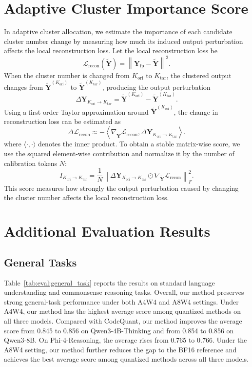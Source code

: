 \documentclass{article}
\begin{document}
\section{Adaptive Cluster Importance Score}
\label{sec:app:importance_score}
In adaptive cluster allocation, we estimate the importance of each candidate cluster number change by measuring how much its induced output perturbation affects the local reconstruction loss.
Let the local reconstruction loss be
\[
\mathcal{L}_{\mathrm{recon}}(\widetilde{\mathbf{Y}})
=
\left\|
\mathbf{Y}_{\mathrm{fp}}-\widetilde{\mathbf{Y}}
\right\|^2 .
\]
When the cluster number is changed from $K_{\mathrm{ori}}$ to $K_{\mathrm{tar}}$, the clustered output changes from $\widetilde{\mathbf{Y}}^{(K_{\mathrm{ori}})}$ to $\widetilde{\mathbf{Y}}^{(K_{\mathrm{tar}})}$, producing the output perturbation
\[
\Delta \mathbf{Y}_{K_{\mathrm{ori}}\rightarrow K_{\mathrm{tar}}}
=
\widetilde{\mathbf{Y}}^{(K_{\mathrm{ori}})}
-
\widetilde{\mathbf{Y}}^{(K_{\mathrm{tar}})} .
\]
Using a first-order Taylor approximation around
$\widetilde{\mathbf{Y}}^{(K_{\mathrm{ori}})}$, the change in reconstruction loss can be estimated as
\[
\Delta \mathcal{L}_{\mathrm{recon}}
\approx -
\left\langle
\nabla_{\widetilde{\mathbf{Y}}}\mathcal{L}_{\mathrm{recon}},
\Delta \mathbf{Y}_{K_{\mathrm{ori}}\rightarrow K_{\mathrm{tar}}}
\right\rangle .
\]
where $\langle \cdot,\cdot\rangle$ denotes the inner product.
To obtain a stable matrix-wise score, we use the squared element-wise contribution and normalize it by the number of calibration tokens $N$:
\[
I_{K_{\mathrm{ori}}\rightarrow K_{\mathrm{tar}}}
=
\frac{1}{N}
\left\|
\Delta\mathbf{Y}_{K_{\mathrm{ori}}\rightarrow K_{\mathrm{tar}}}
\odot
\nabla_{\widetilde{\mathbf{Y}}}
\mathcal{L}_{\mathrm{recon}}
\right\|_F^2.
\]
This score measures how strongly the output perturbation caused by changing the cluster number affects the local reconstruction loss.


\section{Additional Evaluation Results}

\subsection{General Tasks}
Table~\ref{tab:eval:general_task} reports the results on standard language understanding and commonsense reasoning tasks. Overall, our method preserves strong general-task performance under both A4W4 and A8W4 settings. Under A4W4, our method has the highest average score among quantized methods on all three models. Compared with CodeQuant, our method improves the average score from 0.845 to 0.856 on Qwen3-4B-Thinking and from 0.854 to 0.856 on Qwen3-8B. On Phi-4-Reasoning, the average rises from 0.765 to 0.766.
Under the A8W4 setting, our method further reduces the gap to the BF16 reference and achieves the best average score among quantized methods across all three models.
\end{document}

